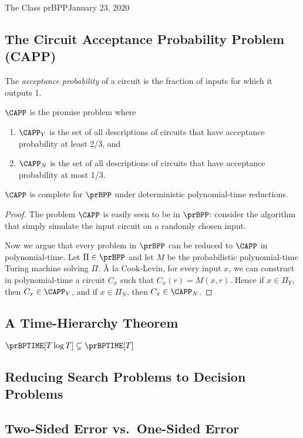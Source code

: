 \begin{lecture}{1}{The Class prBPP}{January 23, 2020}
\subsection{The Circuit Acceptance Probability Problem (CAPP)}

The \emph{acceptance probability} of a circuit is the fraction of inputs for
which it outputs 1.

\begin{definition}[$\CAPP$]
  $\CAPP$ is the promise problem where
  \begin{enumerate}
    \item $\CAPP_Y$ is the set of all descriptions of circuits that have
      acceptance probability at least 2/3, and
    \item $\CAPP_N$ is the set of all descriptions of circuits that have
      acceptance probability at most 1/3.
  \end{enumerate}
\end{definition}

\begin{theorem}
  $\CAPP$ is complete for $\prBPP$ under deterministic polynomial-time reductions.
\end{theorem}


\begin{proof}
  The problem $\CAPP$ is easily seen to be in $\prBPP$: consider the algorithm
  that simply simulate the input circuit on a randomly chosen input.

  Now we argue that every problem in $\prBPP$ can be reduced to $\CAPP$ in
  polynomial-time. Let $\Pi \in \prBPP$ and let $M$ be the probabilistic
  polynomial-time Turing machine solving $\Pi$. {\`A} la Cook-Levin, for every
  input $x$, we can construct in polynomial-time a circuit $C_x$ such that
  $C_x(r) = M(x, r)$. Hence if $x \in \Pi_Y$, then $C_x \in \CAPP_Y$, and if $x
  \in \Pi_N$, then $C_x \in \CAPP_N$.
\end{proof}

\subsection{A Time-Hierarchy Theorem}

\begin{theorem}
  $\prBPTIME[T \log{T}] \subsetneq \prBPTIME[T]$
\end{theorem}


\subsection{Reducing Search Problems to Decision Problems}

\subsection{Two-Sided Error vs.\ One-Sided Error}

\end{lecture}
